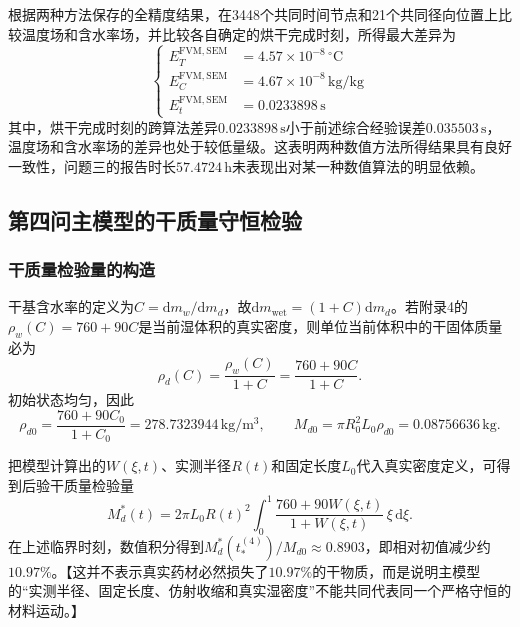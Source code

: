 \documentclass[withoutpreface,bwprint]{cumcmthesis}
\begin{document}
根据两种方法保存的全精度结果，在3448个共同时间节点和21个共同径向位置上比较温度场和含水率场，并比较各自确定的烘干完成时刻，所得最大差异为
\begin{equation}
\left\{
\begin{aligned}
E_T^{\mathrm{FVM,SEM}}&=4.57\times10^{-8}\,{}^\circ\mathrm C\\
E_C^{\mathrm{FVM,SEM}}&=4.67\times10^{-8}\,\mathrm{kg/kg}\\
E_t^{\mathrm{FVM,SEM}}&=0.0233898\,\mathrm s
\end{aligned}
\right.
\label{eq:q3-cross-algorithm-differences}
\end{equation}
其中，烘干完成时刻的跨算法差异$0.0233898\,\mathrm s$小于前述综合经验误差$0.035503\,\mathrm s$，温度场和含水率场的差异也处于较低量级。这表明两种数值方法所得结果具有良好一致性，问题三的报告时长$57.4724\,\mathrm h$未表现出对某一种数值算法的明显依赖。



\subsection{第四问主模型的干质量守恒检验}

\subsubsection{干质量检验量的构造}

干基含水率的定义为$C=\mathrm dm_w/\mathrm dm_d$，故$\mathrm dm_{\mathrm{wet}}=(1+C)\mathrm dm_d$。若附录4的$\rho_w(C)=760+90C$是当前湿体积的真实密度，则单位当前体积中的干固体质量必为
\begin{equation}
\boxed{
\rho_d(C)=\frac{\rho_w(C)}{1+C}
=\frac{760+90C}{1+C}.
}
\label{eq:q4-check-dry-density}
\end{equation}
初始状态均匀，因此
\begin{equation}
\rho_{d0}=\frac{760+90C_0}{1+C_0}
=278.7323944\,\mathrm{kg/m^3},
\qquad
M_{d0}=\pi R_0^2L_0\rho_{d0}
=0.08756636\,\mathrm{kg}.
\label{eq:q4-check-initial-mass}
\end{equation}

把模型计算出的$W(\xi,t)$、实测半径$R(t)$和固定长度$L_0$代入真实密度定义，可得到后验干质量检验量
\begin{equation}
M_d^*(t)=2\pi L_0R(t)^2
\int_0^1\frac{760+90W(\xi,t)}{1+W(\xi,t)}\,\xi\,\mathrm d\xi.
\label{eq:q4-check-mass-proxy}
\end{equation}
在上述临界时刻，数值积分得到$M_d^*(t_*^{(4)})/M_{d0}\approx0.8903$，即相对初值减少约$10.97\%$。【这并不表示真实药材必然损失了$10.97\%$的干物质，而是说明主模型的“实测半径、固定长度、仿射收缩和真实湿密度”不能共同代表同一个严格守恒的材料运动。】
\end{document}
